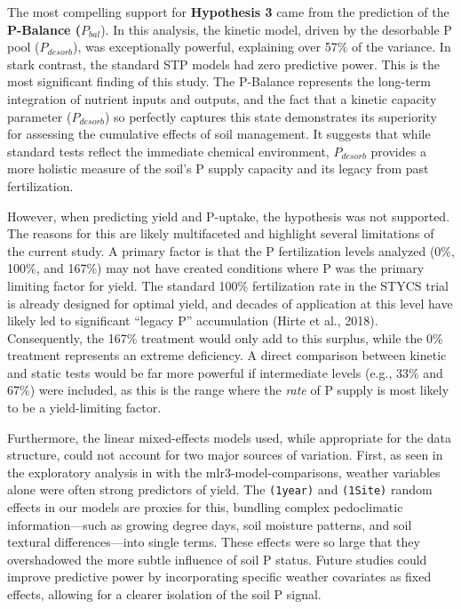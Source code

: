 \documentclass[
  a4paper,
]{article}
\begin{document}
The most compelling support for \textbf{Hypothesis 3} came from the
prediction of the \textbf{P-Balance (}\(P_{bal}\)). In this analysis,
the kinetic model, driven by the desorbable P pool (\(P_{desorb}\)), was
exceptionally powerful, explaining over 57\% of the variance. In stark
contrast, the standard STP models had zero predictive power. This is the
most significant finding of this study. The P-Balance represents the
long-term integration of nutrient inputs and outputs, and the fact that
a kinetic capacity parameter (\(P_{desorb}\)) so perfectly captures this
state demonstrates its superiority for assessing the cumulative effects
of soil management. It suggests that while standard tests reflect the
immediate chemical environment, \(P_{desorb}\) provides a more holistic
measure of the soil's P supply capacity and its legacy from past
fertilization.

However, when predicting yield and P-uptake, the hypothesis was not
supported. The reasons for this are likely multifaceted and highlight
several limitations of the current study. A primary factor is that the P
fertilization levels analyzed (0\%, 100\%, and 167\%) may not have
created conditions where P was the primary limiting factor for yield.
The standard 100\% fertilization rate in the STYCS trial is already
designed for optimal yield, and decades of application at this level
have likely led to significant ``legacy P'' accumulation (Hirte et al.,
2018). Consequently, the 167\% treatment would only add to this surplus,
while the 0\% treatment represents an extreme deficiency. A direct
comparison between kinetic and static tests would be far more powerful
if intermediate levels (e.g., 33\% and 67\%) were included, as this is
the range where the \emph{rate} of P supply is most likely to be a
yield-limiting factor.

Furthermore, the linear mixed-effects models used, while appropriate for
the data structure, could not account for two major sources of
variation. First, as seen in the exploratory analysis in with the
mlr3-model-comparisons, weather variables alone were often strong
predictors of yield. The \texttt{(1\textbar{}year)} and
\texttt{(1\textbar{}Site)} random effects in our models are proxies for
this, bundling complex pedoclimatic information---such as growing degree
days, soil moisture patterns, and soil textural differences---into
single terms. These effects were so large that they overshadowed the
more subtle influence of soil P status. Future studies could improve
predictive power by incorporating specific weather covariates as fixed
effects, allowing for a clearer isolation of the soil P signal.
\end{document}
